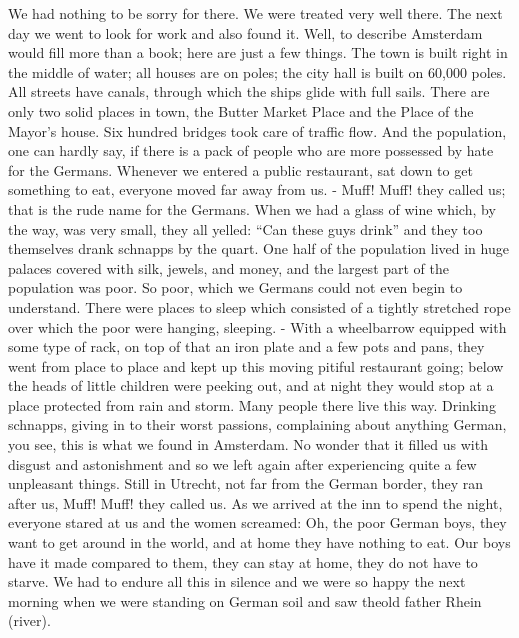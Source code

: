 We had nothing to be sorry for there. We were treated very well there. The next day we went to look for work and also found it. Well, to describe Amsterdam would fill more than a book; here are just a few things. The town is built right in the middle of water; all houses are on poles; the city hall is built on 60,000 poles. All streets have canals, through which the ships glide with full sails. There are only two solid places in town, the Butter Market Place and the Place of the Mayor's house. Six hundred bridges took care of traffic flow. And the population, one can hardly say, if there is a pack of people who are more possessed by hate for the Germans. Whenever we entered a public restaurant, sat down to get something to eat, everyone moved far away from us. - Muff! Muff! they called us; that is the rude name for the Germans. When we had a glass of wine which, by the way, was very small, they all yelled: ``Can these guys drink'' and they too themselves drank schnapps by the quart. One half of the population lived in huge palaces covered with silk, jewels, and money, and the largest part of the population was poor. So poor, which we Germans could not even begin to understand. There were places to sleep which consisted of a tightly stretched rope over which the poor were hanging, sleeping. - With a wheelbarrow equipped with some type of rack, on top of that an iron plate and a few pots and pans, they went from place to place and kept up this moving pitiful restaurant going; below the heads of little children were peeking out, and at night they would stop at a place protected from rain and storm. Many people there live this way. Drinking schnapps, giving in to their worst passions, complaining about anything German, you see, this is what we found in Amsterdam. No wonder that it filled us with disgust and astonishment and so we left again after experiencing quite a few unpleasant things. Still in Utrecht, not far from the German border, they ran after us, Muff! Muff! they called us. As we arrived at the inn to spend the night, everyone stared at us and the women screamed: Oh, the poor German boys, they want to get around in the world, and at home they have nothing to eat. Our boys have it made compared to them, they can stay at home, they do not have to starve. We had to endure all this in silence and we were so happy the next morning when we were standing on German soil and saw theold father Rhein (river).

